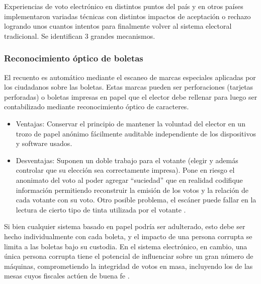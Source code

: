 Experiencias de voto electrónico en distintos puntos del país y en otros países implementaron variadas técnicas con distintos impactos de aceptación o rechazo logrando unos cuantos intentos para finalmente volver al sistema electoral tradicional. Se identifican 3 grandes mecanismos.
\subsubsection{Reconocimiento óptico de boletas}
El recuento es automático mediante el escaneo de marcas especiales aplicadas por los ciudadanos sobre las boletas. Estas marcas pueden ser perforaciones (tarjetas perforadas) o boletas impresas en papel que el elector debe rellenar para luego ser contabilizado mediante reconocimiento óptico de caracteres. %
\begin{itemize}
    \item Ventajas: Conservar el principio de mantener la voluntad del elector en un trozo de papel anónimo fácilmente auditable independiente de los dispositivos y software usados.
    \item Desventajas: Suponen un doble trabajo para el votante (elegir y además controlar que su elección sea correctamente impresa). Pone en riesgo el anonimato del voto al poder agregar “suciedad” que en realidad codifique información permitiendo reconstruir la emisión de los votos y la relación de cada votante con su voto. Otro posible problema, el escáner puede fallar en la lectura de cierto tipo de tinta utilizada por el votante \cite{RecuentoAutomaticoFallas}. \newline
\end{itemize}
Si bien cualquier sistema basado en papel podría ser adulterado, esto debe ser hecho individualmente con cada boleta, y el impacto de una persona corrupta se limita a las boletas bajo su custodia. En el sistema electrónico, en cambio, una única persona corrupta tiene el potencial de influenciar sobre un gran número de máquinas, comprometiendo la integridad de votos en masa, incluyendo los de las mesas cuyos fiscales actúen de buena fe \cite{libroVoto}.

